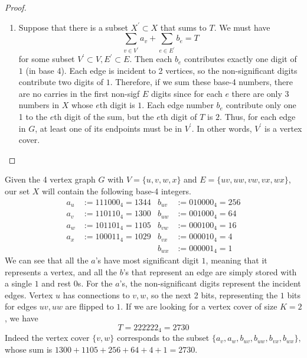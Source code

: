 \begin{proof}
\begin{enumerate}
      \item Suppose that there is a subset $X^\prime \subset X$ that sums to $T$. We must have 
      \begin{equation}
        \sum_{v \in V^\prime} a_v + \sum_{e \in E^\prime} b_e = T
      \end{equation}
      for some subset $V^\prime \subset V, E^\prime \subset E$. Then each $b_e$ contributes exactly one digit of $1$ (in base 4). Each edge is incident to 2 vertices, so the non-significant digits contribute two digits of $1$. Therefore, if we sum these base-4 numbers, there are no carries in the first non-sigf $E$ digits since for each $e$ there are only 3 numbers in $X$ whose $e$th digit is $1$. Each edge number $b_e$ contribute only one 1 to the $e$th digit of the sum, but the $e$th digit of $T$ is $2$. Thus, for each edge in $G$, at least one of its endpoints must be in $V^\prime$. In other words, $V^\prime$ is a vertex cover. 
    \end{enumerate}

  \end{proof}

  \begin{example} 
    Given the 4 vertex graph $G$ with $V = \{u, v, w, x\}$ and $E = \{uv, uw, vw, vx, wx\}$, our set $X$ will contain the following base-4 integers. 
    \begin{align*}
      a_u &:= 111000_4 = 1344 & b_{uv} &:= 010000_4 = 256 \\
      a_v &:= 110110_4 = 1300 & b_{uw} &:= 001000_4 = 64 \\
      a_w &:= 101101_4 = 1105 & b_{vw} &:= 000100_4 = 16 \\
      a_x &:= 100011_4 = 1029 & b_{vx} &:= 000010_4 = 4 \\
      & & b_{wx} &:= 000001_4 = 1
    \end{align*} 
    We can see that all the $a$'s have most significant digit $1$, meaning that it represents a vertex, and all the $b$'s that represent an edge are simply stored with a single $1$ and rest $0$s. For the $a$'s, the non-significant digits represent the incident edges. Vertex $u$ has connections to $v, w$, so the next 2 bits, representing the $1$ bits for edges $uv, uw$ are flipped to $1$. If we are looking for a vertex cover of size $K = 2$, we have 
    \begin{equation}
      T = 222222_4 = 2730
    \end{equation} 
    Indeed the vertex cover $\{v, w\}$ corresponds to the subset $\{a_v, a_w, b_{uv}, b_{uw}, b_{vx}, b_{wx}\}$, whose sum is $1300 + 1105 + 256 + 64 + 4 + 1 = 2730$. 
  \end{example}


